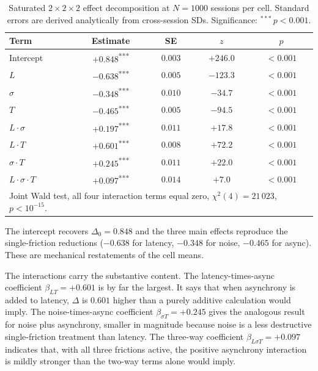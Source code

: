 \begin{table}[H]
\centering
\caption{Saturated $2\times 2\times 2$ effect decomposition at $N=1000$ sessions per cell. Standard errors are derived analytically from cross-session SDs. Significance: $^{***}\,p<0.001$.}
\label{tab:factorial-regression}
\renewcommand{\arraystretch}{1.05}
\begin{tabular}{lcccc}
\toprule
Term & Estimate & SE & $z$ & $p$ \\
\midrule
Intercept                & $+0.848$\textsuperscript{***} & $0.003$ & $+246.0$ & $<\!0.001$ \\
$L$                      & $-0.638$\textsuperscript{***} & $0.005$ & $-123.3$ & $<\!0.001$ \\
$\sigma$                 & $-0.348$\textsuperscript{***} & $0.010$ & $-34.7$  & $<\!0.001$ \\
$T$                      & $-0.465$\textsuperscript{***} & $0.005$ & $-94.5$  & $<\!0.001$ \\
$L\cdot\sigma$           & $+0.197$\textsuperscript{***} & $0.011$ & $+17.8$  & $<\!0.001$ \\
$L\cdot T$               & $+0.601$\textsuperscript{***} & $0.008$ & $+72.2$  & $<\!0.001$ \\
$\sigma\cdot T$          & $+0.245$\textsuperscript{***} & $0.011$ & $+22.0$  & $<\!0.001$ \\
$L\cdot\sigma\cdot T$    & $+0.097$\textsuperscript{***} & $0.014$ & $+7.0$   & $<\!0.001$ \\
\midrule
\multicolumn{5}{l}{Joint Wald test, all four interaction terms equal zero, $\chi^2(4) = 21\,023$, $p<10^{-15}$.} \\
\bottomrule
\end{tabular}
\end{table}

The intercept recovers $\Delta_0 = 0.848$ and the three main effects reproduce the single-friction reductions ($-0.638$ for latency, $-0.348$ for noise, $-0.465$ for async). These are mechanical restatements of the cell means.

The interactions carry the substantive content. The latency-times-async coefficient $\beta_{LT} = +0.601$ is by far the largest. It says that when asynchrony is added to latency, $\Delta$ is $0.601$ higher than a purely additive calculation would imply. The noise-times-async coefficient $\beta_{\sigma T} = +0.245$ gives the analogous result for noise plus asynchrony, smaller in magnitude because noise is a less destructive single-friction treatment than latency. The three-way coefficient $\beta_{L\sigma T} = +0.097$ indicates that, with all three frictions active, the positive asynchrony interaction is mildly stronger than the two-way terms alone would imply.

